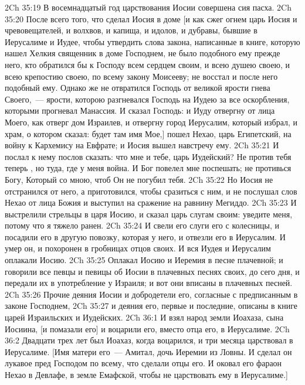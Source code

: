 \vs 2Ch 35:19 В восемнадцатый год царствования Иосии совершена сия пасха.
\rsbpar\vs 2Ch 35:20 После всего того, что сделал Иосия в доме  [и как сжег огнем царь Иосия и чревовещателей, и волхвов, и капища, и идолов, и дубравы, бывшие в Иерусалиме и Иудее, чтобы утвердить слова закона, написанные в книге, которую нашел Хелкия священник в доме Господнем, не было подобного ему прежде него, кто обратился бы к Господу всем сердцем своим, и всею душею своею, и всею крепостию своею, по всему закону Моисееву; не восстал и после него подобный ему. Однако же не отвратился Господь от великой ярости гнева Своего,~--- ярости, которою разгневался Господь на Иудею за все оскорбления, которыми прогневал Манассия. И сказал Господь: и Иуду отвергну от лица Моего, как отверг дом Израилев, и отвергну город Иерусалим, который избрал, и храм, о котором сказал: будет там имя Мое,] пошел Нехао, царь Египетский, на войну к Кархемису на Евфрате; и Иосия вышел навстречу ему.
\vs 2Ch 35:21 И послал к нему  послов сказать: что мне и тебе, царь Иудейский? Не против тебя теперь , но туда, где у меня война. И Бог повелел мне поспешать; не противься Богу, Который со мною, чтоб Он не погубил тебя.
\vs 2Ch 35:22 Но Иосия не отстранился от него, а приготовился, чтобы сразиться с ним, и не послушал слов Нехао от лица Божия и выступил на сражение на равнину Мегиддо.
\vs 2Ch 35:23 И выстрелили стрельцы в царя Иосию, и сказал царь слугам своим: уведите меня, потому что я тяжело ранен.
\vs 2Ch 35:24 И свели его слуги его с колесницы, и посадили его в другую повозку, которая  у него, и отвезли его в Иерусалим. И умер он, и похоронен в гробницах отцов своих. И вся Иудея и Иерусалим оплакали Иосию.
\vs 2Ch 35:25 Оплакал Иосию и Иеремия в песне плачевной; и говорили все певцы и певицы об Иосии в плачевных песнях своих,  до сего дня, и передали их в употребление у Израиля; и вот они вписаны в  плачевных песней.
\rsbpar\vs 2Ch 35:26 Прочие деяния Иосии и добродетели его, согласные с предписанным в законе Господнем,
\vs 2Ch 35:27 и деяния его, первые и последние, описаны в книге царей Израильских и Иудейских.
\vs 2Ch 36:1 И взял народ земли Иоахаза, сына Иосиина, [и помазали его] и воцарили его, вместо отца его, в Иерусалиме.
\vs 2Ch 36:2 Двадцати трех лет был Иоахаз, когда воцарился, и три месяца царствовал в Иерусалиме. [Имя матери его~--- Амитал, дочь Иеремии из Ловны. И сделал он лукавое пред Господом по всему, что сделали отцы его. И оковал его фараон Нехао в Девлафе, в земле Емафской, чтобы не царствовать ему в Иерусалиме.]
